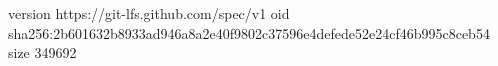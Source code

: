 version https://git-lfs.github.com/spec/v1
oid sha256:2b601632b8933ad946a8a2e40f9802c37596e4defede52e24cf46b995c8ceb54
size 349692
